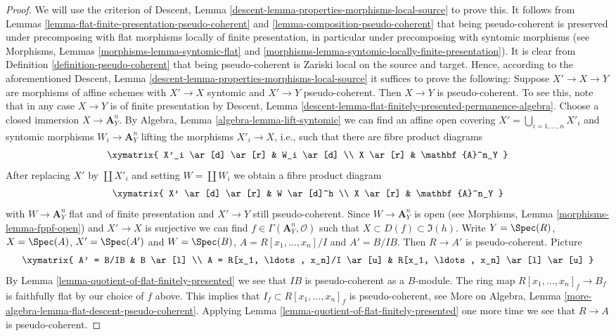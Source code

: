 \begin{proof}
We will use the criterion of
Descent, Lemma \ref{descent-lemma-properties-morphisms-local-source}
to prove this. It follows from
Lemmas \ref{lemma-flat-finite-presentation-pseudo-coherent} and
\ref{lemma-composition-pseudo-coherent}
that being pseudo-coherent is preserved under precomposing with
flat morphisms locally of finite presentation, in particular under
precomposing with syntomic morphisms (see
Morphisms, Lemmas \ref{morphisms-lemma-syntomic-flat} and
\ref{morphisms-lemma-syntomic-locally-finite-presentation}).
It is clear from
Definition \ref{definition-pseudo-coherent}
that being pseudo-coherent is
Zariski local on the source and target.
Hence, according to the aforementioned
Descent, Lemma \ref{descent-lemma-properties-morphisms-local-source}
it suffices to prove the following: Suppose $X' \to X \to Y$ are
morphisms of affine schemes with $X' \to X$ syntomic and $X' \to Y$
pseudo-coherent. Then $X \to Y$ is pseudo-coherent.
To see this, note that in any case $X \to Y$ is of finite presentation by
Descent, Lemma \ref{descent-lemma-flat-finitely-presented-permanence-algebra}.
Choose a closed immersion $X \to \mathbf{A}^n_Y$. By
Algebra, Lemma \ref{algebra-lemma-lift-syntomic}
we can find an affine open covering $X' = \bigcup_{i = 1, \ldots, n} X'_i$
and syntomic morphisms $W_i \to \mathbf{A}^n_Y$ lifting the morphisms
$X'_i \to X$, i.e., such that there are fibre product diagrams
$$
\xymatrix{
X'_i \ar[d] \ar[r] & W_i \ar[d] \\
X \ar[r] & \mathbf{A}^n_Y
}
$$
After replacing $X'$ by $\coprod X'_i$ and setting $W = \coprod W_i$
we obtain a fibre product diagram
$$
\xymatrix{
X' \ar[d] \ar[r] & W \ar[d]^h \\
X \ar[r] & \mathbf{A}^n_Y
}
$$
with $W \to \mathbf{A}^n_Y$ flat and of finite presentation and
$X' \to Y$ still pseudo-coherent. Since
$W \to \mathbf{A}^n_Y$ is open (see
Morphisms, Lemma \ref{morphisms-lemma-fppf-open})
and $X' \to X$ is surjective we can find
$f \in \Gamma(\mathbf{A}^n_Y, \mathcal{O})$ such that
$X \subset D(f) \subset \Im(h)$. Write
$Y = \Spec(R)$, $X = \Spec(A)$, $X' = \Spec(A')$
and $W = \Spec(B)$, $A = R[x_1, \ldots, x_n]/I$ and
$A' = B/IB$. Then $R \to A'$ is pseudo-coherent. Picture
$$
\xymatrix{
A' = B/IB & B \ar[l] \\
A = R[x_1, \ldots, x_n]/I \ar[u] & R[x_1, \ldots, x_n] \ar[l] \ar[u]
}
$$
By
Lemma \ref{lemma-quotient-of-flat-finitely-presented}
we see that $IB$ is pseudo-coherent as a $B$-module.
The ring map $R[x_1, \ldots, x_n]_f \to B_f$ is faithfully flat by
our choice of $f$ above. This implies that
$I_f \subset R[x_1, \ldots, x_n]_f$
is pseudo-coherent, see
More on Algebra, Lemma \ref{more-algebra-lemma-flat-descent-pseudo-coherent}.
Applying
Lemma \ref{lemma-quotient-of-flat-finitely-presented}
one more time we see that $R \to A$ is pseudo-coherent.
\end{proof}


